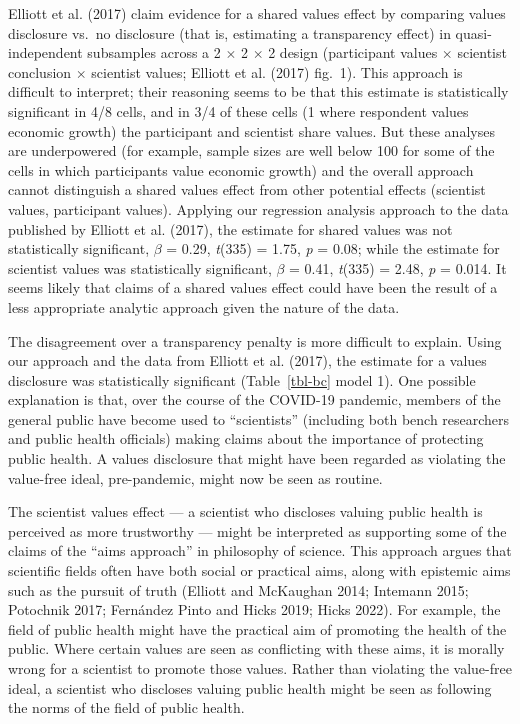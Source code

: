 \documentclass[
  letterpaper,
  DIV=11,
  numbers=noendperiod]{scrartcl}
\begin{document}
Elliott et al. (2017) claim evidence for a shared values effect by
comparing values disclosure vs.~no disclosure (that is, estimating a
transparency effect) in quasi-independent subsamples across a 2
\(\times\) 2 \(\times\) 2 design (participant values \(\times\)
scientist conclusion \(\times\) scientist values; Elliott et al. (2017)
fig.~1). This approach is difficult to interpret; their reasoning seems
to be that this estimate is statistically significant in 4/8 cells, and
in 3/4 of these cells (1 where respondent values economic growth) the
participant and scientist share values. But these analyses are
underpowered (for example, sample sizes are well below 100 for some of
the cells in which participants value economic growth) and the overall
approach cannot distinguish a shared values effect from other potential
effects (scientist values, participant values). Applying our regression
analysis approach to the data published by Elliott et al. (2017), the
estimate for shared values was not statistically significant, \(\beta\)
= 0.29, \emph{t}(335) = 1.75, \emph{p} = 0.08; while the estimate for
scientist values was statistically significant, \(\beta\) = 0.41,
\emph{t}(335) = 2.48, \emph{p} = 0.014. It seems likely that claims of a
shared values effect could have been the result of a less appropriate
analytic approach given the nature of the data.

The disagreement over a transparency penalty is more difficult to
explain. Using our approach and the data from Elliott et al. (2017), the
estimate for a values disclosure was statistically significant
(Table~\ref{tbl-bc} model 1). One possible explanation is that, over the
course of the COVID-19 pandemic, members of the general public have
become used to ``scientists'' (including both bench researchers and
public health officials) making claims about the importance of
protecting public health. A values disclosure that might have been
regarded as violating the value-free ideal, pre-pandemic, might now be
seen as routine.

The scientist values effect --- a scientist who discloses valuing public
health is perceived as more trustworthy --- might be interpreted as
supporting some of the claims of the ``aims approach'' in philosophy of
science. This approach argues that scientific fields often have both
social or practical aims, along with epistemic aims such as the pursuit
of truth (Elliott and McKaughan 2014; Intemann 2015; Potochnik 2017;
Fernández Pinto and Hicks 2019; Hicks 2022). For example, the field of
public health might have the practical aim of promoting the health of
the public. Where certain values are seen as conflicting with these
aims, it is morally wrong for a scientist to promote those values.
Rather than violating the value-free ideal, a scientist who discloses
valuing public health might be seen as following the norms of the field
of public health.
\end{document}
